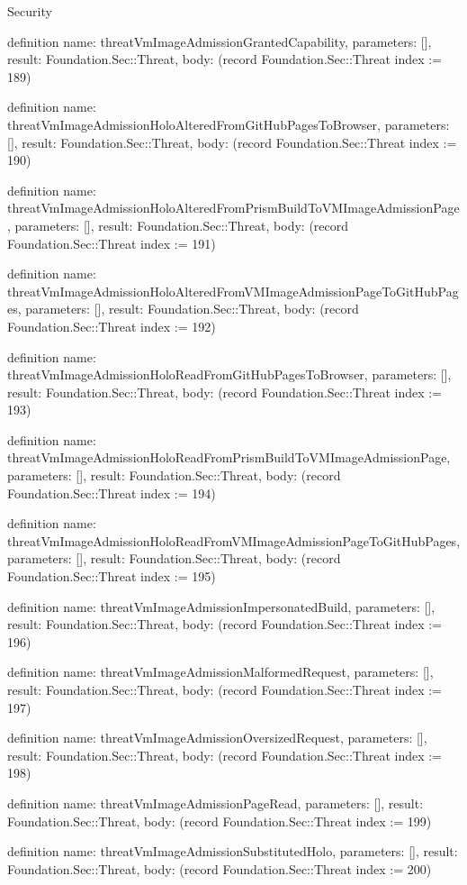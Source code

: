 \begin{lexlean}{Security}
\begin{semanticmodule}
definition{
  name: threatVmImageAdmissionGrantedCapability,
  parameters: [],
  result: Foundation.Sec::Threat,
  body: (record Foundation.Sec::Threat {index := 189})
}

definition{
  name: threatVmImageAdmissionHoloAlteredFromGitHubPagesToBrowser,
  parameters: [],
  result: Foundation.Sec::Threat,
  body: (record Foundation.Sec::Threat {index := 190})
}

definition{
  name: threatVmImageAdmissionHoloAlteredFromPrismBuildToVMImageAdmissionPage,
  parameters: [],
  result: Foundation.Sec::Threat,
  body: (record Foundation.Sec::Threat {index := 191})
}

definition{
  name: threatVmImageAdmissionHoloAlteredFromVMImageAdmissionPageToGitHubPages,
  parameters: [],
  result: Foundation.Sec::Threat,
  body: (record Foundation.Sec::Threat {index := 192})
}

definition{
  name: threatVmImageAdmissionHoloReadFromGitHubPagesToBrowser,
  parameters: [],
  result: Foundation.Sec::Threat,
  body: (record Foundation.Sec::Threat {index := 193})
}

definition{
  name: threatVmImageAdmissionHoloReadFromPrismBuildToVMImageAdmissionPage,
  parameters: [],
  result: Foundation.Sec::Threat,
  body: (record Foundation.Sec::Threat {index := 194})
}

definition{
  name: threatVmImageAdmissionHoloReadFromVMImageAdmissionPageToGitHubPages,
  parameters: [],
  result: Foundation.Sec::Threat,
  body: (record Foundation.Sec::Threat {index := 195})
}

definition{
  name: threatVmImageAdmissionImpersonatedBuild,
  parameters: [],
  result: Foundation.Sec::Threat,
  body: (record Foundation.Sec::Threat {index := 196})
}

definition{
  name: threatVmImageAdmissionMalformedRequest,
  parameters: [],
  result: Foundation.Sec::Threat,
  body: (record Foundation.Sec::Threat {index := 197})
}

definition{
  name: threatVmImageAdmissionOversizedRequest,
  parameters: [],
  result: Foundation.Sec::Threat,
  body: (record Foundation.Sec::Threat {index := 198})
}

definition{
  name: threatVmImageAdmissionPageRead,
  parameters: [],
  result: Foundation.Sec::Threat,
  body: (record Foundation.Sec::Threat {index := 199})
}

definition{
  name: threatVmImageAdmissionSubstitutedHolo,
  parameters: [],
  result: Foundation.Sec::Threat,
  body: (record Foundation.Sec::Threat {index := 200})
}


\end{semanticmodule}
\end{lexlean}
